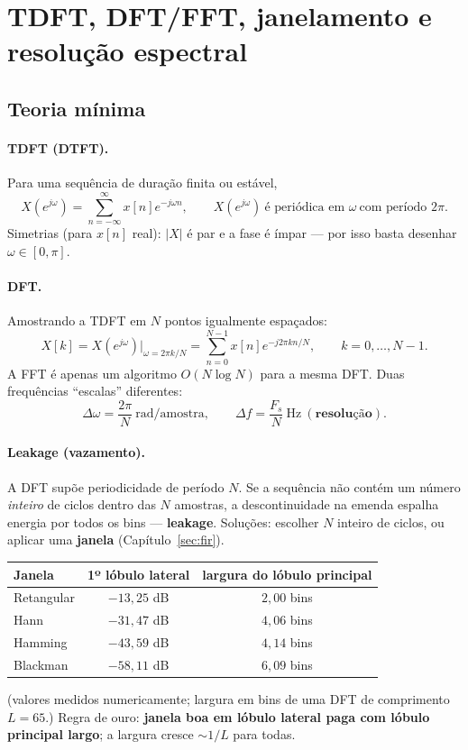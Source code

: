 \section{TDFT, DFT/FFT, janelamento e resolução espectral}

\subsection*{Teoria mínima}

\paragraph{TDFT (DTFT).} Para uma sequência de duração finita ou estável,
\[
  X(e^{j\omega})=\sum_{n=-\infty}^{\infty}x[n]e^{-j\omega n},
  \qquad X(e^{j\omega})\ \text{é periódica em }\omega\ \text{com período }2\pi .
\]
Simetrias (para $x[n]$ real): $|X|$ é par e a fase é ímpar — por isso basta
desenhar $\omega\in[0,\pi]$.

\paragraph{DFT.} Amostrando a TDFT em $N$ pontos igualmente espaçados:
\[
  X[k]=X(e^{j\omega})\Big|_{\omega=2\pi k/N}
       =\sum_{n=0}^{N-1}x[n]e^{-j2\pi kn/N},\qquad k=0,\dots,N-1 .
\]
A FFT é apenas um algoritmo $O(N\log N)$ para a mesma DFT. Duas frequências
``escalas'' diferentes:
\[
  \Delta\omega=\frac{2\pi}{N}\ \text{rad/amostra},\qquad
  \Delta f=\frac{F_s}{N}\ \text{Hz}\ (\textbf{resolução}) .
\]

\paragraph{Leakage (vazamento).} A DFT supõe periodicidade de período $N$. Se
a sequência não contém um número \emph{inteiro} de ciclos dentro das $N$
amostras, a descontinuidade na emenda espalha energia por todos os bins —
\textbf{leakage}. Soluções: escolher $N$ inteiro de ciclos, ou aplicar uma
\textbf{janela} (Capítulo~\ref{sec:fir}).

\begin{center}
\begin{tabular}{lcc}
\toprule
Janela & 1º lóbulo lateral & largura do lóbulo principal\\
\midrule
Retangular & $-13{,}25$ dB & $2{,}00$ bins\\
Hann        & $-31{,}47$ dB & $4{,}06$ bins\\
Hamming     & $-43{,}59$ dB & $4{,}14$ bins\\
Blackman    & $-58{,}11$ dB & $6{,}09$ bins\\
\bottomrule
\end{tabular}
\end{center}
(valores medidos numericamente; largura em bins de uma DFT de comprimento
$L=65$.) Regra de ouro: \textbf{janela boa em lóbulo lateral paga com lóbulo
principal largo}; a largura cresce $\sim1/L$ para todas.


